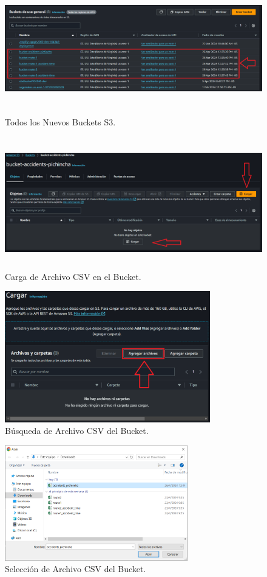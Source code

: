 \documentclass[a4paper,10pt, oneside, titlepage]{article}
\begin{document}
	\begin{figure}[!h]
		\centering
		\includegraphics[width = 1\linewidth, height = 5.7cm]{Todos_Nuevo_Bucket_S3.png}
		\caption{Todos los Nuevos Buckets S3.}
		\label{Todos_Nuevo_Bucket_S3}
	\end{figure}
	\begin{figure}[!h]
		\centering
		\includegraphics[width = 1\linewidth, height = 5.7cm]{Carga_Archivo_CSV_Nuevo_Bucket.png}
		\caption{Carga de Archivo CSV en el Bucket.}
		\label{Carga_Archivo_CSV_Nuevo_Bucket}
	\end{figure}
	\begin{figure}[!h]
		\centering
		\includegraphics[width = 1\linewidth, height = 5.7cm]{Busqueda_Archivo_CSV_Bucket.png}
		\caption{Búsqueda de Archivo CSV del Bucket.}
		\label{Busqueda_Archivo_CSV_Bucket}
	\end{figure}
	\begin{figure}[!h]
		\centering
		\includegraphics[width = 1\linewidth, height = 5cm]{Seleccion_Archivo_CSV_Bucket.png}
		\caption{Selección de Archivo CSV del Bucket.}
		\label{Seleccion_Archivo_CSV_Bucket}
	\end{figure}
\end{document}
